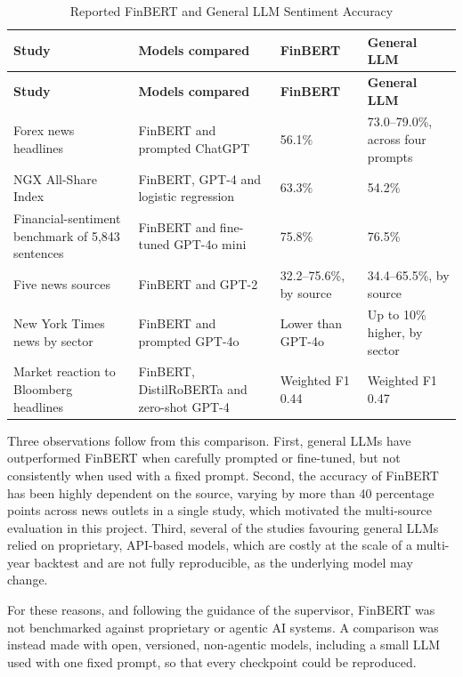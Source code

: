 \begin{longtable}{@{}P{4.3cm}P{3.6cm}P{2.3cm}P{3.0cm}@{}}
\caption{Reported FinBERT and General LLM Sentiment Accuracy}
\label{tab:lit-llm}\\
\toprule
\textbf{Study} & \textbf{Models compared} & \textbf{FinBERT} & \textbf{General LLM} \\
\midrule
\endfirsthead
\toprule
\textbf{Study} & \textbf{Models compared} & \textbf{FinBERT} & \textbf{General LLM} \\
\midrule
\endhead
\bottomrule
\endlastfoot
Forex news headlines \parencite{fatouros2023transforming} & FinBERT and prompted ChatGPT & 56.1\% & 73.0--79.0\%, across four prompts \\
NGX All-Share Index \parencite{ai2024innovative} & FinBERT, GPT-4 and logistic regression & 63.3\% & 54.2\% \\
Financial-sentiment benchmark of 5,843 sentences \parencite{vidhya2025finetuning} & FinBERT and fine-tuned GPT-4o mini & 75.8\% & 76.5\% \\
Five news sources \parencite{liu2025enhancing} & FinBERT and GPT-2 & 32.2--75.6\%, by source & 34.4--65.5\%, by source \\
New York Times news by sector \parencite{electronics2025comparative} & FinBERT and prompted GPT-4o & Lower than GPT-4o & Up to 10\% higher, by sector \\
Market reaction to Bloomberg headlines \parencite{arxiv2024optimizing} & FinBERT, DistilRoBERTa and zero-shot GPT-4 & Weighted F1 0.44 & Weighted F1 0.47 \\
\end{longtable}

Three observations follow from this comparison. First, general LLMs have outperformed FinBERT when carefully prompted or fine-tuned, but not consistently when used with a fixed prompt. Second, the accuracy of FinBERT has been highly dependent on the source, varying by more than 40 percentage points across news outlets in a single study, which motivated the multi-source evaluation in this project. Third, several of the studies favouring general LLMs relied on proprietary, API-based models, which are costly at the scale of a multi-year backtest and are not fully reproducible, as the underlying model may change.

For these reasons, and following the guidance of the supervisor, FinBERT was not benchmarked against proprietary or agentic AI systems. A comparison was instead made with open, versioned, non-agentic models, including a small LLM used with one fixed prompt, so that every checkpoint could be reproduced.

